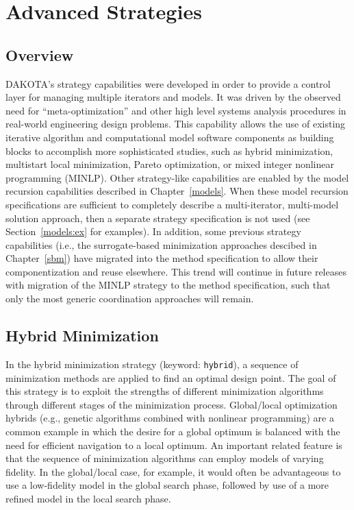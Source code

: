 \chapter{Advanced Strategies}\label{strat}

\section{Overview}\label{strat:overview}

DAKOTA's strategy capabilities were developed in order to provide a
control layer for managing multiple iterators and models. It was
driven by the observed need for ``meta-optimization'' and other high
level systems analysis procedures in real-world engineering design
problems. This capability allows the use of existing iterative
algorithm and computational model software components as building
blocks to accomplish more sophisticated studies, such as hybrid
minimization, multistart local minimization, Pareto optimization, or
mixed integer nonlinear programming (MINLP).  Other strategy-like
capabilities are enabled by the model recursion capabilities described
in Chapter~\ref{models}.  When these model recursion specifications
are sufficient to completely describe a multi-iterator, multi-model
solution approach, then a separate strategy specification is not used
(see Section~\ref{models:ex} for examples).  In addition, some
previous strategy capabilities (i.e., the surrogate-based minimization
approaches descibed in Chapter~\ref{sbm}) have migrated into the
method specification to allow their componentization and reuse
elsewhere.  This trend will continue in future releases with migration
of the MINLP strategy to the method specification, such that only the
most generic coordination approaches will remain.

\section{Hybrid Minimization}\label{strat:hybrid}

In the hybrid minimization strategy (keyword: \texttt{hybrid}), a
sequence of minimization methods are applied to find an optimal design
point. The goal of this strategy is to exploit the strengths of
different minimization algorithms through different stages of the
minimization process. Global/local optimization hybrids (e.g., genetic
algorithms combined with nonlinear programming) are a common example
in which the desire for a global optimum is balanced with the need for
efficient navigation to a local optimum. An important related feature
is that the sequence of minimization algorithms can employ models of
varying fidelity. In the global/local case, for example, it would
often be advantageous to use a low-fidelity model in the global search
phase, followed by use of a more refined model in the local search
phase.

